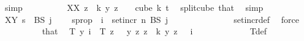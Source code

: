 \begin{isabellebody}
\ simp\isanewline
\isanewline
\ \ \ \ \ \ \ \ \isamarkupfalse%
\ XX{\isacharcolon}{\kern0pt}\ {\isachardoublequoteopen}{\isacharparenleft}{\kern0pt}{\isasymlambda}z\ {\isasymin}\ {\isacharbraceleft}{\kern0pt}{\isachardot}{\kern0pt}{\isachardot}{\kern0pt}{\isacharless}{\kern0pt}k{\isacharbraceright}{\kern0pt}{\isachardot}{\kern0pt}\ y\ {\isacharparenleft}{\kern0pt}z\ {\isacharplus}{\kern0pt}\ {}{\isacharparenright}{\kern0pt}{\isacharparenright}{\kern0pt}\ {\isasymin}\ cube\ k\ {\isacharparenleft}{\kern0pt}t{\isacharplus}{\kern0pt}{}{\isacharparenright}{\kern0pt}{\isachardoublequoteclose}\ \isamarkupfalse%
\ split{\isacharunderscore}{\kern0pt}cube\ that\ \isamarkupfalse%
\ simp\isanewline
\ \ \ \ \ \ \ \ \isamarkupfalse%
\ XY{\isacharcolon}{\kern0pt}\ {\isachardoublequoteopen}s\ {\isasymin}\ BS\ {\isacharparenleft}{\kern0pt}j\ {\isacharminus}{\kern0pt}\ {}{\isacharparenright}{\kern0pt}{\isachardoublequoteclose}\ \isamarkupfalse%
\ s{\isacharunderscore}{\kern0pt}prop\ {}\ {\isacartoucheopen}i\ {\isasymin}\ set{\isacharunderscore}{\kern0pt}incr\ n\ {\isacharparenleft}{\kern0pt}BS\ {\isacharparenleft}{\kern0pt}j\ {\isacharminus}{\kern0pt}\ {}{\isacharparenright}{\kern0pt}{\isacharparenright}{\kern0pt}{\isacartoucheclose}\ \isanewline
\ \ \ \ \ \ \ \ \ \ \isamarkupfalse%
\ set{\isacharunderscore}{\kern0pt}incr{\isacharunderscore}{\kern0pt}def\ \isamarkupfalse%
\ force\isanewline
\isanewline
\ \ \ \ \ \ \ \ \isamarkupfalse%
\ that\ \isamarkupfalse%
\ {\isachardoublequoteopen}T\ y\ i\ {\isacharequal}{\kern0pt}\ {\isacharparenleft}{\kern0pt}T{\isacharprime}{\kern0pt}\ {\isacharparenleft}{\kern0pt}{\isasymlambda}z\ {\isasymin}\ {\isacharbraceleft}{\kern0pt}{\isachardot}{\kern0pt}{\isachardot}{\kern0pt}{\isacharless}{\kern0pt}{}{\isacharbraceright}{\kern0pt}{\isachardot}{\kern0pt}\ y\ z{\isacharparenright}{\kern0pt}\ {\isacharparenleft}{\kern0pt}{\isasymlambda}z\ {\isasymin}\ {\isacharbraceleft}{\kern0pt}{\isachardot}{\kern0pt}{\isachardot}{\kern0pt}{\isacharless}{\kern0pt}k{\isacharbraceright}{\kern0pt}{\isachardot}{\kern0pt}\ y\ {\isacharparenleft}{\kern0pt}z\ {\isacharplus}{\kern0pt}\ {}{\isacharparenright}{\kern0pt}{\isacharparenright}{\kern0pt}{\isacharparenright}{\kern0pt}\ i{\isachardoublequoteclose}\ \isanewline
\ \ \ \ \ \ \ \ \ \ \isamarkupfalse%
\ T{\isacharunderscore}{\kern0pt}def\ \isamarkupfalse%

\end{isabellebody}
